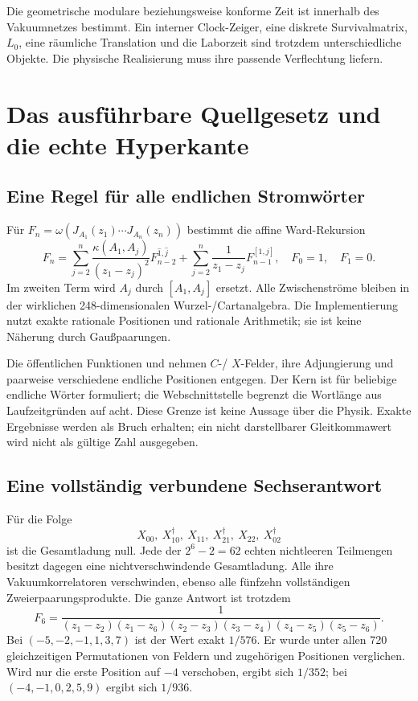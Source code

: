 Die geometrische modulare beziehungsweise konforme Zeit ist innerhalb des Vakuumnetzes bestimmt. Ein interner Clock-Zeiger, eine diskrete Survivalmatrix, $L_0$, eine räumliche Translation und die Laborzeit sind trotzdem unterschiedliche Objekte. Die physische Realisierung muss ihre passende Verflechtung liefern.

\section{Das ausführbare Quellgesetz und die echte Hyperkante}\label{sec:ward}

\subsection{Eine Regel für alle endlichen Stromwörter}
Für $F_n=\omega(J_{A_1}(z_1)\cdots J_{A_n}(z_n))$ bestimmt die affine Ward-Rekursion
\begin{equation}\label{eq:ward}
F_n=\sum_{j=2}^n\frac{\kappa(A_1,A_j)}{(z_1-z_j)^2}
F_{n-2}^{\widehat1,\widehat j}
+\sum_{j=2}^n\frac{1}{z_1-z_j}F_{n-1}^{[1,j]},
\quad F_0=1,\quad F_1=0.
\end{equation}
Im zweiten Term wird $A_j$ durch $[A_1,A_j]$ ersetzt. Alle Zwischenströme bleiben in der wirklichen 248-dimensionalen Wurzel-/Cartanalgebra. Die Implementierung nutzt exakte rationale Positionen und rationale Arithmetik; sie ist keine Näherung durch Gaußpaarungen.

Die öffentlichen Funktionen  und  nehmen $C$-/ $X$-Felder, ihre Adjungierung und paarweise verschiedene endliche Positionen entgegen. Der Kern ist für beliebige endliche Wörter formuliert; die Webschnittstelle begrenzt die Wortlänge aus Laufzeitgründen auf acht. Diese Grenze ist keine Aussage über die Physik. Exakte Ergebnisse werden als Bruch erhalten; ein nicht darstellbarer Gleitkommawert wird nicht als gültige Zahl ausgegeben.

\subsection{Eine vollständig verbundene Sechserantwort}
Für die Folge
\begin{equation}
X_{00},\ X_{10}^{\dagger},\ X_{11},\ X_{21}^{\dagger},\ X_{22},\ X_{02}^{\dagger}
\end{equation}
ist die Gesamtladung null. Jede der $2^6-2=62$ echten nichtleeren Teilmengen besitzt dagegen eine nichtverschwindende Gesamtladung. Alle ihre Vakuumkorrelatoren verschwinden, ebenso alle fünfzehn vollständigen Zweierpaarungsprodukte. Die ganze Antwort ist trotzdem
\begin{equation}\label{eq:hex}
F_6=\frac{1}{(z_1-z_2)(z_1-z_6)(z_2-z_3)
(z_3-z_4)(z_4-z_5)(z_5-z_6)}.
\end{equation}
Bei $(-5,-2,-1,1,3,7)$ ist der Wert exakt $1/576$. Er wurde unter allen 720 gleichzeitigen Permutationen von Feldern und zugehörigen Positionen verglichen. Wird nur die erste Position auf $-4$ verschoben, ergibt sich $1/352$; bei $(-4,-1,0,2,5,9)$ ergibt sich $1/936$.

